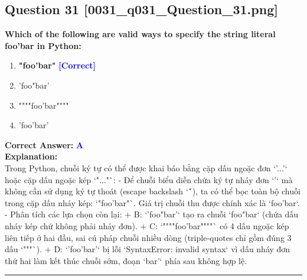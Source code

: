 \documentclass[11pt,a4paper]{article}
\begin{document}
\begin{minipage}{\textwidth}
\subsection*{Question 31 \quad \footnotesize{[0031_q031_Question_31.png]}}
\noindent \textbf{Which of the following are valid ways to specify the string literal foo'bar in Python:}

\begin{enumerate}[label=\Alph*.]
    \item \textbf{"foo'bar"} \hfill \textcolor{blue}{\textbf{[Correct]}}
    \item 'foo"bar'
    \item """"foo'bar""""
    \item 'foo'bar'
\end{enumerate}

\noindent \textbf{Correct Answer:} \textcolor{blue}{\textbf{A}} \\[4pt]
\noindent \textbf{Explanation:}\\
Trong Python, chuỗi ký tự có thể được khai báo bằng cặp dấu ngoặc đơn `'...'` hoặc cặp dấu ngoặc kép `"..."`:\newline
- Để chuỗi biểu diễn chứa ký tự nháy đơn `'` mà không cần sử dụng ký tự thoát (escape backslash `\'`), ta có thể bọc toàn bộ chuỗi trong cặp dấu nháy kép: `"foo'bar"`. Giá trị chuỗi thu được chính xác là `foo'bar`.\newline
- Phân tích các lựa chọn còn lại:\newline
  + B: `'foo"bar'` tạo ra chuỗi `foo"bar` (chứa dấu nháy kép chứ không phải nháy đơn).\newline
  + C: `""""foo'bar""""` có 4 dấu ngoặc kép liên tiếp ở hai đầu, sai cú pháp chuỗi nhiều dòng (triple-quotes chỉ gồm đúng 3 dấu `"""`).\newline
  + D: `'foo'bar'` bị lỗi `SyntaxError: invalid syntax` vì dấu nháy đơn thứ hai làm kết thúc chuỗi sớm, đoạn `bar'` phía sau không hợp lệ.
\end{minipage}
\vspace{0.8cm}
\hrule
\vspace{0.5cm}
\end{document}
